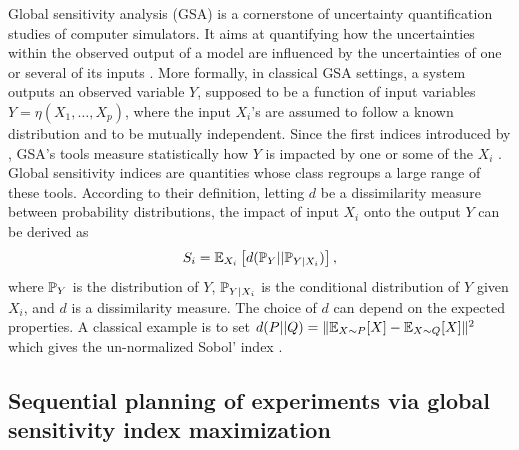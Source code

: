 Global sensitivity analysis (GSA) %
{is a cornerstone of uncertainty quantification studies of computer simulators}. It aims at quantifying how the uncertainties within the observed output of a model are influenced by the uncertainties of one or several of its inputs \citep{iooss_review_2015}.
More formally, in classical GSA settings, a system outputs an observed variable $Y$, supposed to be a function of input variables $Y=\eta(X_1,\dots,X_p)$, where the input $X_i$'s are assumed to follow a known distribution and to be mutually independent. 
Since the first indices introduced by \citet{sobol_sensitivity_1993}, GSA's tools measure statistically how $Y$ is impacted by one or some of the $X_i$ \citep{da_veiga_basics_2021}.
Global sensitivity indices \citep{da_veiga_global_2015} are quantities whose class regroups a large range of these tools.
%
According to their definition, letting $d$ be a dissimilarity measure between probability distributions, the impact of input $X_i$ onto the output $Y$ can be derived as
    \begin{equation}
        S_i = \mathbb{E}_{X_i}\left[d(\mathbb{P}_{Y}||\mathbb{P}_{Y|X_i})\right] ,
    \end{equation}
where $\mathbb{P}_Y$ is the distribution of $Y$, $\mathbb{P}_{Y|X_i}$ is the conditional distribution of $Y$ given $X_i$, and 
$d$ is a dissimilarity measure. The choice of $d$ can depend on the expected properties. A classical example is to set $d(P||Q)=\|\mathbb{E}_{X\sim P}[X]-\mathbb{E}_{X\sim Q}[X]\|^2$ which gives the un-normalized Sobol' index \citep{sobol_sensitivity_1993}.



\subsection{Sequential planning of experiments via global sensitivity index maximization}

